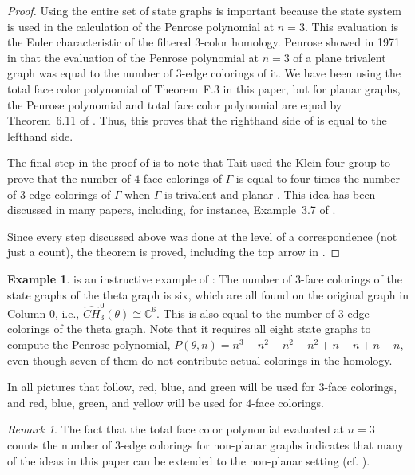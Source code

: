 \documentclass[12pt]{amsart}
\theoremstyle{definition}
\newtheorem{example}[theorem]{Example}
\theoremstyle{remark}
\newtheorem{remark}[theorem]{Remark}
\numberwithin{equation}{section}
\newcommand{\BC}{\mathbb{C}}
\begin{document}
\begin{proof}
Using the entire set of state graphs is important because the state system is used in the calculation of the  Penrose polynomial at $n=3$. This evaluation is the Euler characteristic of the filtered $3$-color homology. Penrose showed in 1971 in \cite{Penrose} that the evaluation of the Penrose polynomial at $n=3$ of a plane trivalent graph was equal to the number of $3$-edge colorings of it.  We have been using the total face color polynomial of Theorem~F.3 in this paper, but for planar graphs, the Penrose polynomial and total face color polynomial are equal by Theorem~6.11 of \cite{BMcC}.    Thus, this proves that the righthand side of  is equal to the lefthand side.

The final step in the proof of  is to note that Tait used the Klein four-group to prove that the number of $4$-face colorings of $\Gamma$ is equal to four times the number of $3$-edge colorings of $\Gamma$ when $\Gamma$ is trivalent and planar \cite{Tait}.  This idea has been discussed in many papers, including, for instance, Example~3.7 of \cite{BMcC}. 

Since every step discussed above was done at the level of a correspondence (not just a count), the theorem is proved, including the top arrow in .
\end{proof}

\begin{example}
 is an instructive example of : The number of $3$-face colorings of the state graphs of the theta graph is six, which are all found on the original graph in Column 0, i.e., $\widehat{CH}^0_3(\theta) \cong \BC^6$. This is also equal to the number of $3$-edge colorings of the theta graph. Note that it requires all eight state graphs to compute the Penrose polynomial, $P(\theta,n) = n^3 - n^2 - n^2- n^2 +n+n+n-n$, even though seven of them do not contribute actual colorings in the homology.
\end{example}

In all pictures that follow, red, blue, and green will be used for $3$-face colorings, and red, blue, green, and yellow will be used for $4$-face colorings.


\begin{remark} The fact that the total face color polynomial evaluated at $n=3$ counts the number of $3$-edge colorings for non-planar graphs indicates  that many of the ideas in this paper can be extended to the non-planar setting (cf. \cite{BKM}). 
\end{remark}
\end{document}
